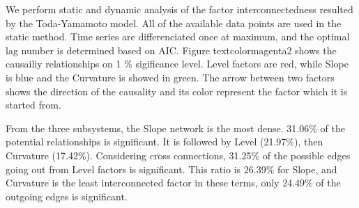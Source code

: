\documentclass[12pt,bibliography=totoc]{article}
\begin{document}
We perform static and dynamic analysis of the factor interconnectedness resulted by the Toda-Yamamoto model. All of the available data points are used in the static method. Time series are differenciated once at maximum, and the optimal lag number is determined based on AIC. Figure textcolor{magenta}{2} shows the causailiy relationships on 1 \% sigificance level. Level factors are red, while Slope is blue and the Curvature is showed in green. The arrow between two factors shows the direction of the causality and its color represent the factor which it is started from.


From the three subsystems, the Slope network is the most dense. 31.06\% of the potential relationships is significant. It is followed by Level (21.97\%), then Curvature (17.42\%). Considering cross connections, 31.25\% of the possible edges going out from Level factors is significant. This ratio is 26.39\% for Slope, and Curvature is the least interconnected factor in these terms, only 24.49\% of the outgoing edges is significant.
\end{document}
